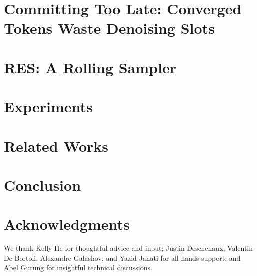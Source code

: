 \documentclass[11pt, a4paper, logo, copyright, gdm]{google}
\begin{document}
\section{Committing Too Late: Converged Tokens Waste Denoising Slots}
\label{sec:too-late}


\section{RES: A Rolling Sampler}
\label{sec:method}


\section{Experiments}
\label{sec:experiments}


\section{Related Works}
\label{sec:adjacentworks}


\section{Conclusion}


\section*{Acknowledgments}
We thank Kelly He for thoughtful advice and input; Justin Deschenaux, Valentin De Bortoli, Alexandre Galashov, and Yazid Janati for all hands support; and Abel Gurung for insightful technical discussions.
\FloatBarrier
\begingroup
\small
\setlength{\bibsep}{4pt}
\setlength{\parskip}{0pt}


\endgroup

\clearpage
\appendix

\end{document}
